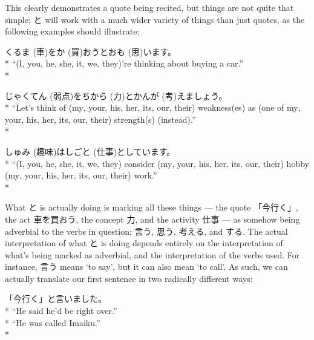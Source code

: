 \documentclass[11pt, b5paper, twoside, openright, onecolumn]{book}
\makeatletter
\newcommand*{\rubystack}[2]{{\relscale{0.5}%
  \begin{tabular}[b]{@{}c@{}}%
    {#1}\\%
   {\textscale{2}{#2}}%
  \end{tabular}}%
}
\DeclareRobustCommand*{\ruby}[2]{%
  \mbox{%
    \setlength{\parskip}{0ex}%
    \BeginAccSupp{method=pdfstringdef,ActualText={#1}}%
      \rubystack{\phantom{#2}}{#1}%
      \llap{%
        \rubystack{#2}{\phantom{#1}}%
      }%
    \EndAccSupp{}%
  }%
}
\renewcommand*{\ruby}[2]{#2 (#1)}%
\newenvironment{exampleblock}{
\setlength{\parindent}{0.6in}
\begin{minipage}[t]{\dimexpr\textwidth-\parindent}}
{\end{minipage}}
\makeatother
\begin{document}
This clearly demonstrates a quote being recited‚ but things are not quite that simple; と will work with a much wider variety of things than just quotes‚ as the following examples should illustrate:

\vspace{0.4cm}
\begin{exampleblock}
\ruby{車}{くるま}を\ruby{買}{か}おうと\ruby{思}{おも}います。 \\* 
“(I‚ you‚ he‚ she‚ it‚ we‚ they)’re thinking about buying a car.” \\* 
\end{exampleblock}
\vspace{0.2cm}

\begin{exampleblock}
\ruby{弱点}{じゃくてん}を\ruby{力}{ちから}と\ruby{考}{かんが}えましょう。 \\* 
“Let’s think of (my‚ your‚ his‚ her‚ its‚ our‚ their) weakness(es) as (one of my‚ your‚ his‚ her‚ its‚ our‚ their) strength(s) (instead).” \\* 
\end{exampleblock}
\vspace{0.2cm}

\begin{exampleblock}
\ruby{趣味}{しゅみ}は\ruby{仕事}{しごと}としています。 \\* 
“(I‚ you‚ he‚ she‚ it‚ we‚ they) consider (my‚ your‚ his‚ her‚ its‚ our‚ their) hobby (my‚ your‚ his‚ her‚ its‚ our‚ their) work.” \\* 
\end{exampleblock}
\vspace{0.2cm}

What と is actually doing is marking all these things — the quote 「今行く」‚ the  act 車を買おう‚ the concept 力‚ and the activity 仕事 — as somehow being adverbial to the verbs in question; 言う‚ 思う‚ 考える‚ and する. The actual interpretation of what と is doing depends entirely on the interpretation of what’s being marked as adverbial‚ and the interpretation of the verbs used. For instance‚ 言う means ‘to say’‚ but it can also mean ‘to call’. As such‚ we can actually translate our first sentence in two radically different ways:

\vspace{0.4cm}
\begin{exampleblock}
「今行く」と言いました。 \\* 
“He said he’d be right over.” \\* 
“He was called Imaiku.” \\* 
\end{exampleblock}
\vspace{0.2cm}
\end{document}
